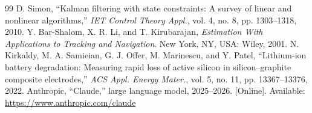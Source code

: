 \documentclass[journal]{IEEEtran}
\begin{document}
\begin{thebibliography}{99}
 D. Simon, ``Kalman filtering with state constraints: A survey of linear and nonlinear algorithms,'' \emph{IET Control Theory Appl.}, vol. 4, no. 8, pp. 1303--1318, 2010.
 Y. Bar-Shalom, X. R. Li, and T. Kirubarajan, \emph{Estimation With Applications to Tracking and Navigation}. New York, NY, USA: Wiley, 2001.
 N. Kirkaldy, M. A. Samieian, G. J. Offer, M. Marinescu, and Y. Patel, ``Lithium-ion battery degradation: Measuring rapid loss of active silicon in silicon--graphite composite electrodes,'' \emph{ACS Appl. Energy Mater.}, vol. 5, no. 11, pp. 13367--13376, 2022.
 Anthropic, ``Claude,'' large language model, 2025--2026. [Online]. Available: \url{https://www.anthropic.com/claude}
\end{thebibliography}
\end{document}
